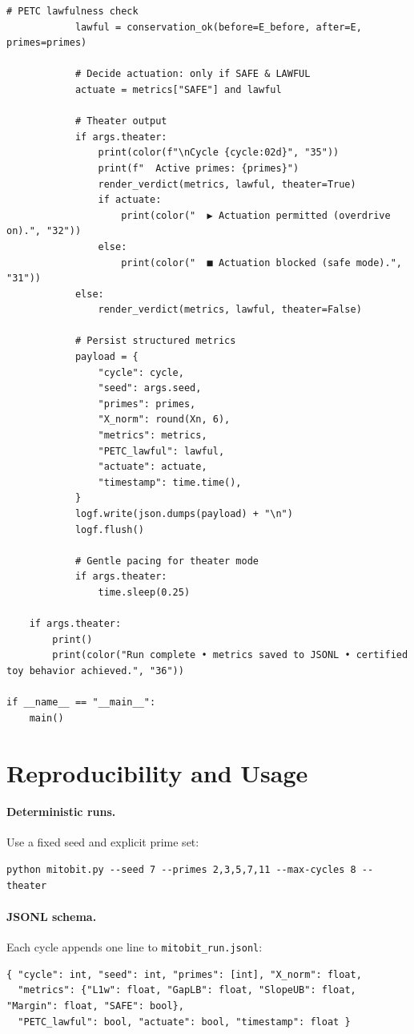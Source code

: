 \documentclass[11pt]{article}
\begin{document}
\begin{lstlisting}[style=py,caption={Mitobit (ACE/PETC revision). Self-contained script with weighted-$\ell_1$ projection, ACE surrogates, and PETC prime-lawfulness.},label={lst:code}]
            # PETC lawfulness check
            lawful = conservation_ok(before=E_before, after=E, primes=primes)

            # Decide actuation: only if SAFE & LAWFUL
            actuate = metrics["SAFE"] and lawful

            # Theater output
            if args.theater:
                print(color(f"\nCycle {cycle:02d}", "35"))
                print(f"  Active primes: {primes}")
                render_verdict(metrics, lawful, theater=True)
                if actuate:
                    print(color("  ▶ Actuation permitted (overdrive on).", "32"))
                else:
                    print(color("  ■ Actuation blocked (safe mode).", "31"))
            else:
                render_verdict(metrics, lawful, theater=False)

            # Persist structured metrics
            payload = {
                "cycle": cycle,
                "seed": args.seed,
                "primes": primes,
                "X_norm": round(Xn, 6),
                "metrics": metrics,
                "PETC_lawful": lawful,
                "actuate": actuate,
                "timestamp": time.time(),
            }
            logf.write(json.dumps(payload) + "\n")
            logf.flush()

            # Gentle pacing for theater mode
            if args.theater:
                time.sleep(0.25)

    if args.theater:
        print()
        print(color("Run complete • metrics saved to JSONL • certified toy behavior achieved.", "36"))

if __name__ == "__main__":
    main()
\end{lstlisting}

\section{Reproducibility and Usage}
\label{sec:repro}
\paragraph{Deterministic runs.} Use a fixed seed and explicit prime set:
\begin{verbatim}
python mitobit.py --seed 7 --primes 2,3,5,7,11 --max-cycles 8 --theater
\end{verbatim}

\paragraph{JSONL schema.} Each cycle appends one line to \texttt{mitobit\_run.jsonl}:
\begin{verbatim}
{ "cycle": int, "seed": int, "primes": [int], "X_norm": float,
  "metrics": {"L1w": float, "GapLB": float, "SlopeUB": float, "Margin": float, "SAFE": bool},
  "PETC_lawful": bool, "actuate": bool, "timestamp": float }
\end{verbatim}
\end{document}
